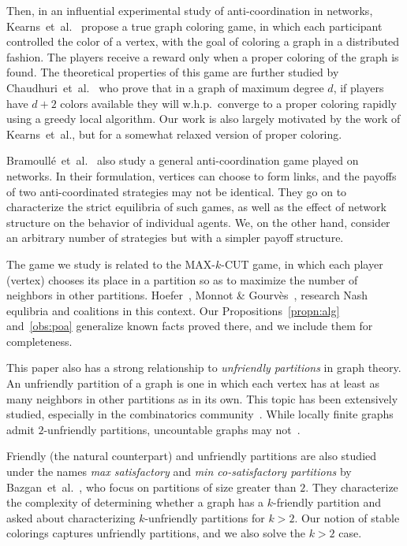 \documentclass{llncs}
\begin{document}
Then, in an influential experimental study of anti-coordination in networks,
Kearns~et~al.~\cite{KearnsSM06} propose a true graph coloring game, in which
each participant controlled the color of a vertex, with the goal of coloring a
graph in a distributed fashion.  The players receive a reward only when a
proper coloring of the graph is found.  The theoretical properties of this
game are further studied by Chaudhuri~et~al.~\cite{ChaudhuriGJ08} who prove
that in a graph of maximum degree $d$, if players have $d + 2$ colors available
they will w.h.p.\ converge to a proper coloring rapidly using a greedy local
algorithm.  Our work is also largely motivated by the work of Kearns~et~al.,
but for a somewhat relaxed version of proper coloring.

Bramoull\'{e}~et~al.~\cite{BramoulleLGV04} also study a general
anti-coordination game played on networks.  In their formulation, vertices can
choose to form links, and the payoffs of two anti-coordinated strategies
may not be identical.  They go on to characterize the strict equilibria of such
games, as well as the effect of network structure on the behavior of individual
agents.  We, on the other hand, consider an arbitrary number of strategies but
with a simpler payoff structure.

The game we study is related to the MAX-$k$-CUT game, in which
each player (vertex) chooses its place in a partition so as to maximize the
number of neighbors in other partitions. Hoefer~\cite{Hoefer2007}, Monnot \&
Gourv\`es~\cite{G09}, research Nash equlibria and coalitions in this
context. Our Propositions~\ref{propn:alg} and~\ref{obs:poa} generalize known
facts proved there, and we include them for completeness.

This paper also has a strong relationship to \emph{unfriendly
partitions} in graph theory.  An unfriendly partition of a graph is one in
which each vertex has at least as many neighbors in other partitions as in its
own.  This topic has been extensively studied, especially in the combinatorics
community~\cite{AharoniMP90,BruhnDGS10,CowanE,ShelahM90}.
While locally finite graphs admit $2$-unfriendly partitions, uncountable graphs
may not~\cite{ShelahM90}.

Friendly (the natural counterpart) and unfriendly partitions are also studied
under the names \emph{max satisfactory} and \emph{min co-satisfactory
partitions} by Bazgan~et~al.~\cite{BazganTV10}, who focus on partitions of
size greater than $2$.  They characterize the complexity of determining
whether a graph has a $k$-friendly partition and asked about characterizing
$k$-unfriendly partitions for $k > 2$.  Our notion of stable colorings captures
unfriendly partitions, and we also solve the $k>2$ case.
\end{document}
